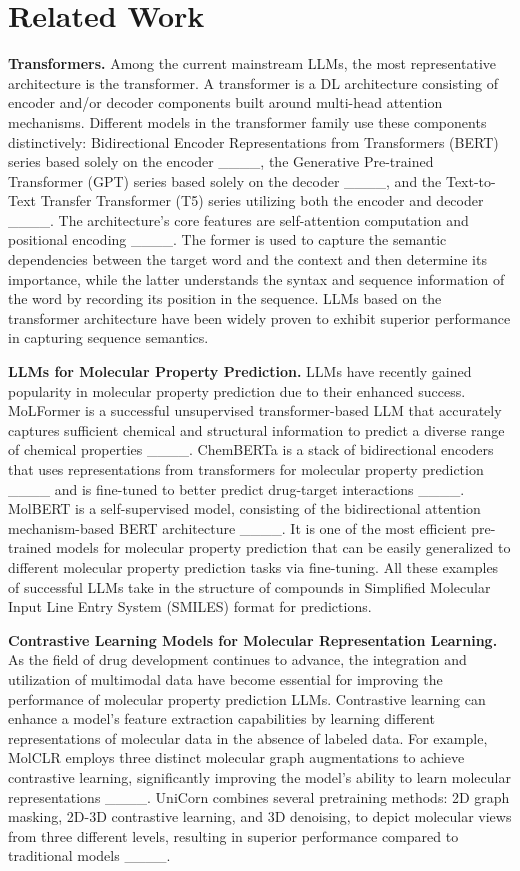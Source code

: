 \section{Related Work}
\textbf{Transformers.} Among the current mainstream LLMs, the most representative architecture is the transformer. A transformer is a DL architecture consisting of encoder and/or decoder components built around multi-head attention mechanisms. Different models in the transformer family use these components distinctively: Bidirectional Encoder Representations from Transformers (BERT) series based solely on the encoder ____, the Generative Pre-trained Transformer (GPT) series based solely on the decoder ____, and the Text-to-Text Transfer Transformer (T5) series utilizing both the encoder and decoder ____. The architecture's core features are self-attention computation and positional encoding ____. The former is used to capture the semantic dependencies between the target word and the context and then determine its importance, while the latter understands the syntax and sequence information of the word by recording its position in the sequence. LLMs based on the transformer architecture have been widely proven to exhibit superior performance in capturing sequence semantics.

\textbf{LLMs for Molecular Property Prediction.} LLMs have recently gained popularity in molecular property prediction due to their enhanced success. MoLFormer is a successful unsupervised transformer-based LLM that accurately captures sufficient chemical and structural information to predict a diverse range of chemical properties ____. ChemBERTa is a stack of bidirectional encoders that uses representations from transformers for molecular property prediction ____ and is fine-tuned to better predict drug-target interactions ____. MolBERT is a self-supervised model, consisting of the bidirectional attention mechanism-based BERT architecture ____. It is one of the most efficient pre-trained models for molecular property prediction that can be easily generalized to different molecular property prediction tasks via fine-tuning. All these examples of successful LLMs take in the structure of compounds in Simplified Molecular Input Line Entry System (SMILES) format for predictions.

\textbf{Contrastive Learning Models for Molecular Representation Learning.} As the field of drug development continues to advance, the integration and utilization of multimodal data have become essential for improving the performance of molecular property prediction LLMs. Contrastive learning can enhance a model's feature extraction capabilities by learning different representations of molecular data in the absence of labeled data. For example, MolCLR employs three distinct molecular graph augmentations to achieve contrastive learning, significantly improving the model's ability to learn molecular representations ____. UniCorn combines several pretraining methods: 2D graph masking, 2D-3D contrastive learning, and 3D denoising, to depict molecular views from three different levels, resulting in superior performance compared to traditional models ____.